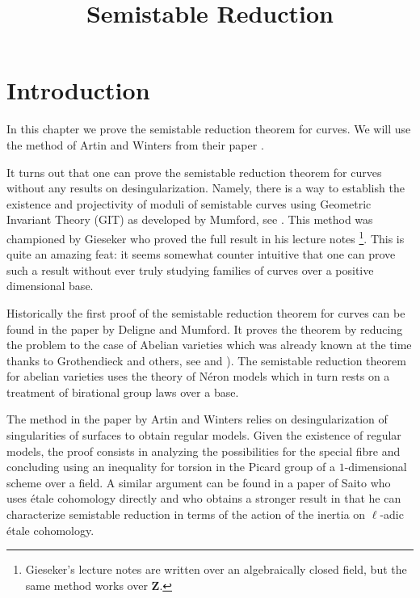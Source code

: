 \documentclass{stacks-project}
\theoremstyle{plain}
\theoremstyle{definition}
\theoremstyle{remark}
\numberwithin{equation}{subsection}
\begin{document}
\title{Semistable Reduction}


\maketitle

\label{section-phantom}

\tableofcontents

\section{Introduction}
\label{section-introduction}

\noindent
In this chapter we prove the semistable reduction theorem for curves.
We will use the method of Artin and Winters from their paper
\cite{Artin-Winters}.

\medskip\noindent
It turns out that one can prove the semistable reduction theorem
for curves without any results on desingularization. Namely, there
is a way to establish the existence and projectivity of moduli
of semistable curves using Geometric Invariant Theory (GIT)
as developed by Mumford, see \cite{GIT}. This method was
championed by Gieseker who proved the full result in his
lecture notes \cite{Gieseker}\footnote{Gieseker's lecture notes
are written over an algebraically closed field, but the same method
works over $\mathbf{Z}$.}. This is quite an amazing
feat: it seems somewhat counter intuitive that one can
prove such a result without ever truly studying families of curves over
a positive dimensional base.

\medskip\noindent
Historically the first proof of the semistable reduction theorem
for curves can be found in the paper \cite{DM} by Deligne and Mumford.
It proves the theorem by reducing the problem to the case of
Abelian varieties which was already known at the time thanks
to Grothendieck and others, see \cite{SGA7-I} and \cite{SGA7-II}).
The semistable reduction theorem for abelian varieties uses the theory
of N\'eron models which in turn rests on a treatment of birational
group laws over a base.

\medskip\noindent
The method in the paper by Artin and Winters relies on desingularization
of singularities of surfaces to obtain regular models. Given the existence
of regular models, the proof consists in analyzing the
possibilities for the special fibre and concluding using an inequality
for torsion in the Picard group of a $1$-dimensional scheme over a field.
A similar argument can be found in a paper \cite{Saito} of Saito who uses
\'etale cohomology directly and who obtains a stronger result in that
he can characterize semistable reduction in terms of the action of
the inertia on $\ell$-adic \'etale cohomology.
\end{document}
